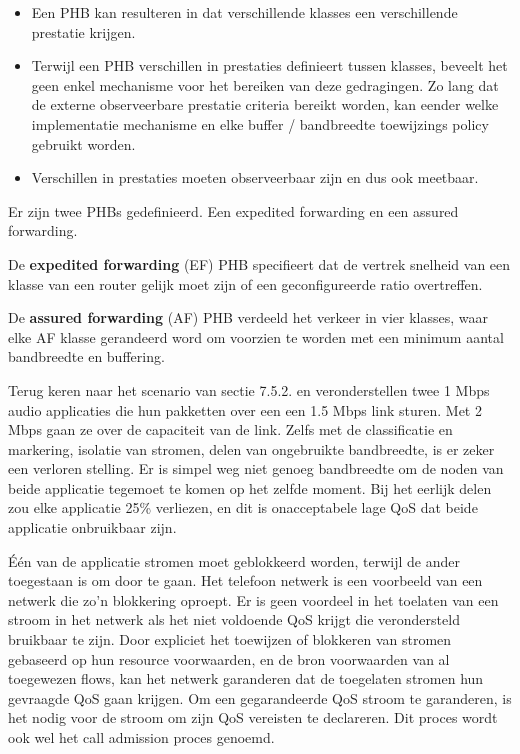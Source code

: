 \begin{itemize}
\item	Een PHB kan resulteren in dat verschillende klasses een verschillende prestatie krijgen.
\item	Terwijl een PHB verschillen in prestaties definieert tussen klasses, beveelt het geen enkel mechanisme voor het bereiken van deze gedragingen. Zo lang dat de externe observeerbare prestatie criteria bereikt worden, kan eender welke implementatie mechanisme en elke buffer / bandbreedte toewijzings policy gebruikt worden.
\item	Verschillen in prestaties moeten observeerbaar zijn en dus ook meetbaar.
\end{itemize}



\noindent Er zijn twee PHBs gedefinieerd. Een expedited forwarding en een assured forwarding.

\noindent De \textbf{expedited forwarding} (EF) PHB specifieert dat de vertrek snelheid van een klasse van een router gelijk moet zijn of een geconfigureerde ratio overtreffen.

\noindent De \textbf{assured forwarding} (AF) PHB verdeeld het verkeer in vier klasses, waar elke AF klasse gerandeerd word om voorzien te worden met een minimum aantal bandbreedte en buffering.


\noindent Terug keren naar het scenario van sectie 7.5.2. en veronderstellen twee 1 Mbps audio applicaties die hun pakketten over een een 1.5 Mbps link sturen. Met 2 Mbps gaan ze over de capaciteit van de link. Zelfs met de classificatie en markering, isolatie van stromen, delen van ongebruikte bandbreedte, is er zeker een verloren stelling. Er is simpel weg niet genoeg bandbreedte om de noden van beide applicatie tegemoet te komen op het zelfde moment. Bij het eerlijk delen zou elke applicatie 25\% verliezen, en dit is onacceptabele lage QoS dat beide applicatie onbruikbaar zijn.

\noindent Één van de applicatie stromen moet geblokkeerd worden, terwijl de ander toegestaan is om door te gaan. Het telefoon netwerk is een voorbeeld van een netwerk die zo’n blokkering oproept. Er is geen voordeel in het toelaten van een stroom in het netwerk als het niet voldoende QoS krijgt die verondersteld bruikbaar te zijn. Door expliciet het toewijzen of blokkeren van stromen gebaseerd op hun resource voorwaarden, en de bron voorwaarden van al toegewezen flows, kan het netwerk garanderen dat de toegelaten stromen hun gevraagde QoS gaan krijgen. Om een gegarandeerde QoS stroom te garanderen, is het nodig voor de stroom om zijn QoS vereisten te declareren. Dit proces wordt ook wel het call admission proces genoemd.


